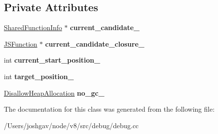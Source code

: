\subsection*{Private Attributes}
\begin{DoxyCompactItemize}
\item 
\hyperlink{classv8_1_1internal_1_1_shared_function_info}{Shared\+Function\+Info} $\ast$ {\bfseries current\+\_\+candidate\+\_\+}\hypertarget{classv8_1_1internal_1_1_shared_function_info_finder_ac13f9d0b379e1a98951c831b7b02354a}{}\label{classv8_1_1internal_1_1_shared_function_info_finder_ac13f9d0b379e1a98951c831b7b02354a}

\item 
\hyperlink{classv8_1_1internal_1_1_j_s_function}{J\+S\+Function} $\ast$ {\bfseries current\+\_\+candidate\+\_\+closure\+\_\+}\hypertarget{classv8_1_1internal_1_1_shared_function_info_finder_a108c901eaac328f8d8faa2124b3d4eec}{}\label{classv8_1_1internal_1_1_shared_function_info_finder_a108c901eaac328f8d8faa2124b3d4eec}

\item 
int {\bfseries current\+\_\+start\+\_\+position\+\_\+}\hypertarget{classv8_1_1internal_1_1_shared_function_info_finder_acfbb9bb6ee150dd34f4fffc8ce60ff87}{}\label{classv8_1_1internal_1_1_shared_function_info_finder_acfbb9bb6ee150dd34f4fffc8ce60ff87}

\item 
int {\bfseries target\+\_\+position\+\_\+}\hypertarget{classv8_1_1internal_1_1_shared_function_info_finder_ac53acb042f2c85120a22765f7a826497}{}\label{classv8_1_1internal_1_1_shared_function_info_finder_ac53acb042f2c85120a22765f7a826497}

\item 
\hyperlink{classv8_1_1internal_1_1_per_thread_assert_scope_debug_only}{Disallow\+Heap\+Allocation} {\bfseries no\+\_\+gc\+\_\+}\hypertarget{classv8_1_1internal_1_1_shared_function_info_finder_a5096f20313e5cec2a3355d2f74244638}{}\label{classv8_1_1internal_1_1_shared_function_info_finder_a5096f20313e5cec2a3355d2f74244638}

\end{DoxyCompactItemize}


The documentation for this class was generated from the following file\+:\begin{DoxyCompactItemize}
\item 
/\+Users/joshgav/node/v8/src/debug/debug.\+cc\end{DoxyCompactItemize}
